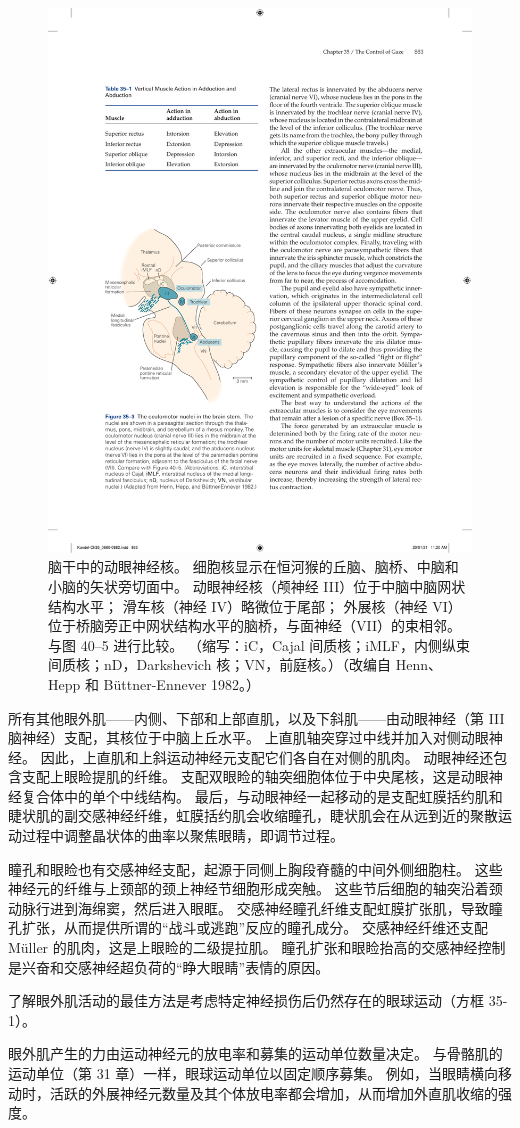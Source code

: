 \begin{figure}[htbp]
	\centering
	\includegraphics[width=0.5\linewidth]{chap35/fig_35_3}
	\caption{脑干中的动眼神经核。 细胞核显示在恒河猴的丘脑、脑桥、中脑和小脑的矢状旁切面中。 动眼神经核（颅神经 III）位于中脑中脑网状结构水平； 滑车核（神经 IV）略微位于尾部； 外展核（神经 VI）位于桥脑旁正中网状结构水平的脑桥，与面神经（VII）的束相邻。 与图 40–5 进行比较。 （缩写：iC，Cajal 间质核；iMLF，内侧纵束间质核；nD，Darkshevich 核；VN，前庭核。）（改编自 Henn、Hepp 和 Büttner-Ennever 1982。）}
	\label{fig:35_3}
\end{figure}

所有其他眼外肌——内侧、下部和上部直肌，以及下斜肌——由动眼神经（第 III 脑神经）支配，其核位于中脑上丘水平。 上直肌轴突穿过中线并加入对侧动眼神经。 因此，上直肌和上斜运动神经元支配它们各自在对侧的肌肉。 动眼神经还包含支配上眼睑提肌的纤维。 支配双眼睑的轴突细胞体位于中央尾核，这是动眼神经复合体中的单个中线结构。 最后，与动眼神经一起移动的是支配虹膜括约肌和睫状肌的副交感神经纤维，虹膜括约肌会收缩瞳孔，睫状肌会在从远到近的聚散运动过程中调整晶状体的曲率以聚焦眼睛，即调节过程。

瞳孔和眼睑也有交感神经支配，起源于同侧上胸段脊髓的中间外侧细胞柱。 这些神经元的纤维与上颈部的颈上神经节细胞形成突触。 这些节后细胞的轴突沿着颈动脉行进到海绵窦，然后进入眼眶。 交感神经瞳孔纤维支配虹膜扩张肌，导致瞳孔扩张，从而提供所谓的“战斗或逃跑”反应的瞳孔成分。 交感神经纤维还支配 Müller 的肌肉，这是上眼睑的二级提拉肌。 瞳孔扩张和眼睑抬高的交感神经控制是兴奋和交感神经超负荷的“睁大眼睛”表情的原因。


了解眼外肌活动的最佳方法是考虑特定神经损伤后仍然存在的眼球运动（方框 35-1）。

眼外肌产生的力由运动神经元的放电率和募集的运动单位数量决定。 与骨骼肌的运动单位（第 31 章）一样，眼球运动单位以固定顺序募集。 例如，当眼睛横向移动时，活跃的外展神经元数量及其个体放电率都会增加，从而增加外直肌收缩的强度。

